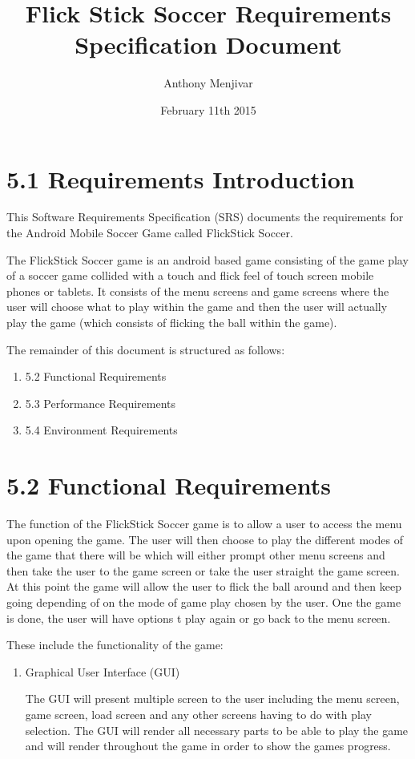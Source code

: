 \documentclass{article}
\title{Flick Stick Soccer Requirements Specification Document}
\author{Anthony Menjivar}
\date{February 11th 2015}
\begin{document}
\maketitle

\section{5.1 Requirements Introduction}
This Software Requirements Specification (SRS) documents the requirements for the Android Mobile Soccer Game called FlickStick Soccer.
\vspace{2mm}

The FlickStick Soccer game is an android based game consisting of the game play of a soccer game collided with a touch and flick feel of touch screen mobile phones or tablets. It consists of the menu screens and game screens where the user will choose what to play within the game and then the user will actually play the game (which consists of flicking the ball within the game).
\vspace{2mm} 

The remainder of this document is structured as follows:
\begin{enumerate}
\item 5.2 Functional Requirements
\item 5.3 Performance Requirements
\item 5.4 Environment Requirements
\end{enumerate} 

\section{5.2 Functional Requirements}
The function of the FlickStick Soccer game is to allow a user to access the menu upon opening the game. The user will then choose to play the different modes of the game that there will be which will either prompt other menu screens and then take the user to the game screen or take the user straight the game screen. At this point the game will allow the user to flick the ball around and then keep going depending of on the mode of game play chosen by the user. One the game is done, the user will have options t play again or go back to the menu screen.
\vspace{2mm}

These include the functionality of the game: 
\begin{enumerate}
\item Graphical User Interface (GUI)
\vspace{2mm}

The GUI will present multiple screen to the user including the menu screen, game screen, load screen and any other screens having to do with play selection. The GUI will render all necessary parts to be able to play the game and will render throughout the game in order to show the games progress.
\end{enumerate}
\end{document}
